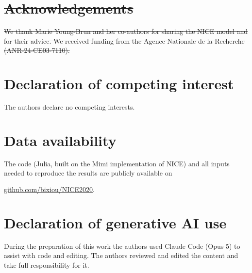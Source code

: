 \documentclass[12pt,english]{article}
\newif\ifblind
\theoremstyle{remark}
\providecommand{\DIFaddtex}[1]{{\protect\color{blue}\uwave{#1}}} %
\providecommand{\DIFdeltex}[1]{{\protect\color{red}\sout{#1}}}                      %
\providecommand{\DIFaddbegin}{} %
\providecommand{\DIFaddend}{} %
\providecommand{\DIFdelbegin}{} %
\providecommand{\DIFdelend}{} %
\providecommand{\DIFadd}[1]{\texorpdfstring{\DIFaddtex{#1}}{#1}} %
\providecommand{\DIFdel}[1]{\texorpdfstring{\DIFdeltex{#1}}{}} %
\newcommand{\DIFscaledelfig}{0.5}
\newlength{\DIFdelgraphicswidth} %
\newlength{\DIFdelgraphicsheight} %
\newcommand{\DIFaddincludegraphics}[2][]{{\color{blue}\fbox{\DIFOincludegraphics[#1]{#2}}}} %
\newcommand{\DIFdelincludegraphics}[2][]{%
\sbox{\DIFdelgraphicsbox}{\DIFOincludegraphics[#1]{#2}}%
\settoboxwidth{\DIFdelgraphicswidth}{\DIFdelgraphicsbox} %
\settoboxtotalheight{\DIFdelgraphicsheight}{\DIFdelgraphicsbox} %
\scalebox{\DIFscaledelfig}{%
\parbox[b]{\DIFdelgraphicswidth}{\usebox{\DIFdelgraphicsbox}\\[-\baselineskip] \rule{\DIFdelgraphicswidth}{0em}}\llap{\resizebox{\DIFdelgraphicswidth}{\DIFdelgraphicsheight}{%
\setlength{\unitlength}{\DIFdelgraphicswidth}%
\begin{picture}(1,1)%
\thicklines\linethickness{2pt} %
{\color[rgb]{1,0,0}\put(0,0){\framebox(1,1){}}}%
{\color[rgb]{1,0,0}\put(0,0){\line( 1,1){1}}}%
{\color[rgb]{1,0,0}\put(0,1){\line(1,-1){1}}}%
\end{picture}%
}\hspace*{3pt}}} %
} %
\DeclareRobustCommand{\DIFaddbegin}{\DIFOaddbegin \let\includegraphics\DIFaddincludegraphics} %
\DeclareRobustCommand{\DIFaddend}{\DIFOaddend \let\includegraphics\DIFOincludegraphics} %
\DeclareRobustCommand{\DIFdelbegin}{\DIFOdelbegin \let\includegraphics\DIFdelincludegraphics} %
\DeclareRobustCommand{\DIFdelend}{\DIFOaddend \let\includegraphics\DIFOincludegraphics} %
\begin{document}
\DIFdelbegin %
\section*{\DIFdel{Acknowledgements}}
\DIFdel{We thank Marie Young-Brun and her co-authors for sharing the NICE model and for their advice. We received funding from the Agence Nationale de la Recherche (ANR-24-CE03-7110). %
}%
\DIFdelend %

\section*{Declaration of competing interest}
The authors declare no competing interests.

\section*{Data availability}

The code (Julia, built on the Mimi implementation of NICE) and all inputs needed to reproduce the results are publicly available on 
\ifblind
[\DIFdelbegin \DIFdel{anonymized }\DIFdelend \DIFaddbegin \DIFadd{anonymised }\DIFaddend for review]
\else
\href{https://github.com/bixiou/NICE2020/tree/main/cap_and_share}{github.com/bixiou/NICE2020}.
\fi

\section*{Declaration of generative AI use}
During the preparation of this work the authors used Claude Code (Opus 5) to assist with code and editing. The authors reviewed and edited the content and take full responsibility for it.
\end{document}
